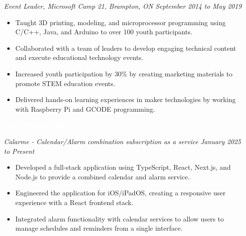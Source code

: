 \documentclass[9pt]{src/developercv}
\begin{document}
  \vspace{1.0\baselineskip}

  \textit{Event Leader, Microsoft Camp 21, Brampton, ON} \hfill \textit{September 2014 to May 2019}
  \begin{itemize}[leftmargin=2em, rightmargin=2.5em, itemsep=0.1em]
    \item Taught 3D printing, modeling, and microprocessor programming using C/C++, Java, and Arduino to over 100 youth participants.
    \item Collaborated with a team of leaders to develop engaging technical content and execute educational technology events.
    \item Increased youth participation by 30\% by creating marketing materials to promote STEM education events.
    \item Delivered hands-on learning experiences in maker technologies by working with Raspberry Pi and GCODE programming.
  \end{itemize}

  \vspace{\baselineskip}
  \colorbox{sky800}{\textcolor{white}{\LARGE\MakeUppercase{\textbf{Key Projects}}}}

  \vspace{1.0\baselineskip}
  
  \textit{Calarme - Calendar/Alarm combination subscription as a service} \hfill \textit{January 2025 to Present}
  \begin{itemize}[leftmargin=2em, rightmargin=2.5em, itemsep=0.1em]
    \item Developed a full-stack application using TypeScript, React, Next.js, and Node.js to provide a combined calendar and alarm service.
    \item Engineered the application for iOS/iPadOS, creating a responsive user experience with a React frontend stack.
    \item Integrated alarm functionality with calendar services to allow users to manage schedules and reminders from a single interface.
  \end{itemize}

  \vspace{1.0\baselineskip}
  
\end{document}
